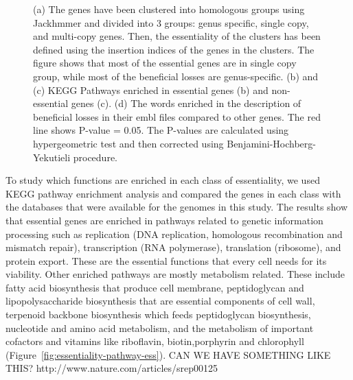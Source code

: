 \documentclass[12pt,letterpaper]{article}
\begin{document}
\begin{figure}
\begin{subfigure}{.5\textwidth}
  \caption{}
  \label{fig:essentiality-pathway-ben}
\end{subfigure}
\caption{(a) The genes have been clustered into homologous groups using Jackhmmer and divided into 3 groups: genus specific, single copy, and multi-copy genes. Then, the essentiality of the clusters has been defined using the insertion indices of the genes in the clusters. The figure shows that most of the essential genes are in single copy group, while most of the beneficial losses are genus-specific. (b) and (c) KEGG Pathways enriched in essential genes (b) and non-essential genes (c). (d) The words enriched in the description of beneficial losses in their embl files compared to other genes. The red line shows P-value = 0.05. The P-values are calculated using hypergeometric test and then corrected using Benjamini-Hochberg-Yekutieli procedure.}
\label{fig:gene-classes}
\end{figure}


To study which functions are enriched in each class of essentiality, we used KEGG pathway enrichment analysis \cite{kanehisa_kegg:_2000} and compared the genes in each class with the databases that were available for the genomes in this study. The results show that essential genes are enriched in pathways related to genetic information processing such as replication (DNA replication, homologous recombination and mismatch repair), transcription (RNA polymerase), translation (ribosome), and protein export. These are the essential functions that every cell needs for its viability. Other enriched pathways are mostly metabolism related. These include fatty acid biosynthesis that produce cell membrane, peptidoglycan and lipopolysaccharide biosynthesis that are essential components of cell wall, terpenoid backbone biosynthesis which feeds peptidoglycan biosynthesis, nucleotide and amino acid metabolism, and the metabolism of important cofactors and vitamins like riboflavin, biotin,porphyrin and chlorophyll (Figure~\ref{fig:essentiality-pathway-ess}).
{\color{red} CAN WE HAVE SOMETHING LIKE THIS? http://www.nature.com/articles/srep00125}
\end{document}
